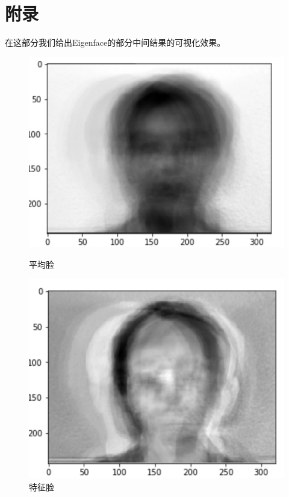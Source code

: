 \documentclass{ctexart}
\begin{document}
\section{附录}
在这部分我们给出Eigenface的部分中间结果的可视化效果。
\begin{figure}[htbp]
    \begin{minipage}[t]{0.45 \linewidth}
        \centering
        \includegraphics[scale=0.23]{imgs/avg_face.png}
        \caption{平均脸}
        \label{avg}
    \end{minipage}
    \begin{minipage}[t]{0.45 \linewidth}
        \centering
        \includegraphics[scale=0.45]{imgs/eigenface.png}
        \caption{特征脸}
        \label{eigenface}
    \end{minipage}
\end{figure}
\end{document}
